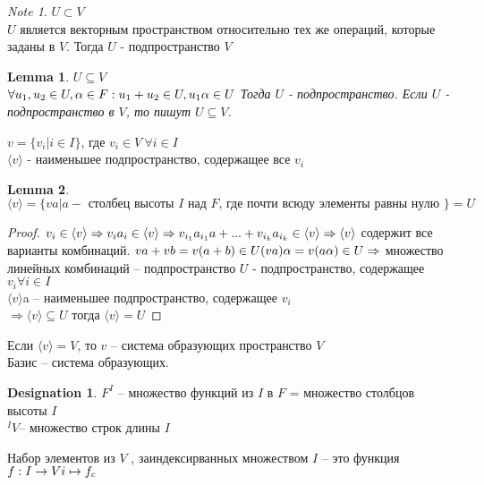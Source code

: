 \documentclass[11pt]{book}
\theoremstyle{definition}
\theoremstyle{plain}
\theoremstyle{plain}
\newtheorem*{lm}{Lemma}
\theoremstyle{definition}
\newtheorem*{name}{Designation}
\theoremstyle{remark}
\newtheorem*{note}{Note}
\begin{document}
\begin{note}
$U \subset V$\\
$U$ является векторным пространством относительно тех же операций, которые заданы в $V$.
Тогда $U$ - подпространство $V$\\
\end{note}

\begin{lm}
$U \subseteq V$\\
$\forall u_1, u_2 \in U, \alpha \in F:\\
u_1+u_2 \in U, u_1 \alpha \in U$
Тогда $U$ - подпространство.
Если $U$ - подпространство в $V$, то пишут $U \subseteq V$.\\
\end{lm}

\begin{defn}
$v = \{v_i | i \in I\}$, где $v_i \in V \: \forall i \in I$\\
$\langle v \rangle$ - наименьшее подпространство, содержащее все $v_i$
\end{defn}

\begin{lm}
$\langle v \rangle = \{va | a - \mbox{ столбец высоты } I \mbox{ над } F \mbox{, где почти всюду элементы равны нулю }\} = U$
\end{lm}
\begin{proof}
$v_i \in \langle v \rangle \Rightarrow v_i a_i \in \langle v \rangle\\
\Rightarrow v_{i_1} a_{i_1}a+ ... + v_{i_k} a_{i_k} \in \langle v \rangle\\
\Rightarrow \langle v \rangle $ содержит все варианты комбинаций.
$va + vb = v(a+b) \in U \\
(va)\alpha = v(a\alpha )\in U\\
\Rightarrow$ множество линейных комбинаций  -- подпространство 
$U$ - подпространство, содержащее $v_i \forall i \in I$\\
$\langle v \rangle $a -- наименьшее подпространство, содержащее $v_i$\\
$\Rightarrow \langle v \rangle \subseteq U$
тогда $\langle v \rangle = U$
\end{proof}

\begin{defn}
Если $\langle v \rangle = V$, то $v$ -- система образующих пространство $V$\\
Базис -- система образующих.
\end{defn}

\begin{name}
$F^I$ -- множество функций из $I$ в $F$ = множество столбцов высоты $I$\\
$ ^I V $--  множество строк длины $I$

Набор элементов из $V$ ,  заиндексирванных множеством $I$ -- это функция $f: I \to V \\ i \mapsto f_c$
\end{name}
\end{document}
